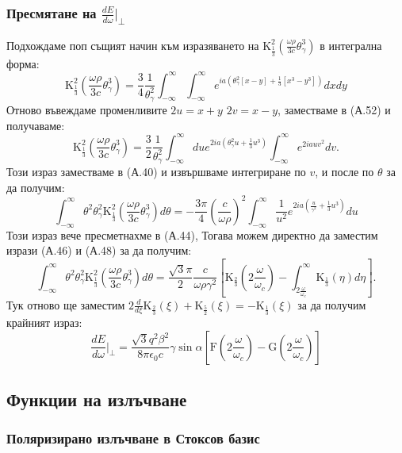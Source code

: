 \begin{appendices}
\subsubsection{Пресмятане на $\frac{dE}{d\omega}\big\vert_\perp$}
Подхождаме поп същият начин към изразяването на  $\text{K}^2_{\frac{1}{3}}\left(\frac{\omega\rho}{3 c}\theta_\gamma^3\right)$ в интегрална форма:
\begin{equation}
	\text{K}^2_{\frac{1}{3}}\left(\frac{\omega\rho}{3 c}\theta_\gamma^3\right) = 	\frac{3}{4}\frac{1}{\theta_\gamma^2}\int_{-\infty}^\infty \int_{-\infty}^\infty e^{ia\left(\theta_\gamma^2[x - y] + \frac{1}{3}[x^3 - y^3]\right)}dxdy
\end{equation}
Отново въвеждаме променливите $2u = x + y$ $2v = x - y$, заместваме в (А.52) и получаваме:
\begin{equation}
	\text{K}^2_{\frac{1}{3}}\left(\frac{\omega\rho}{3 c}\theta_\gamma^3\right) = 	\frac{3}{2}\frac{1}{\theta_\gamma^2}\int_{-\infty}^\infty du e^{2ia\left(\theta_\gamma^2 u + \frac{1}{3}u^3\right)}\int_{-\infty}^{\infty}e^{2iauv^2}dv.
\end{equation}
Този израз заместваме в (А.40) и извършваме интегриране по $v$, и после по $\theta$ за да получим:
\begin{equation}
	\int_{-\infty}^\infty \theta^2\theta_\gamma^2 \text{K}^2_{\frac{1}{3}}\left(\frac{\omega\rho}{3 c}\theta_\gamma^3\right)d\theta = -\frac{3\pi}{4}\left(\frac{c}{\omega\rho}\right)^2\int_{-\infty}^{\infty}\frac{1}{u^2} e^{2ia\left(\frac{u}{\gamma^2}+\frac{1}{3}u^3\right)}du
\end{equation}
Този израз вече пресметнахме в (А.44), Тогава можем директно да заместим изрази (А.46) и (А.48) за да получим:
\begin{equation}
	\int_{-\infty}^\infty \theta^2\theta_\gamma^2 \text{K}^2_{\frac{1}{3}}\left(\frac{\omega\rho}{3 c}\theta_\gamma^3\right)d\theta = \frac{\sqrt{3}\pi}{2}\frac{c}{\omega\rho \gamma^2}\left[\text{K}_{\frac{2}{3}}\left(2\frac{\omega}{\omega_c}\right) - \int_{2\frac{\omega}{\omega_c}}^\infty \text{K}_{\frac{1}{3}}(\eta)d\eta\right].
\end{equation}
Тук отново ще заместим $2\frac{d}{d\xi}\text{K}_{\frac{2}{3}}(\xi) + \text{K}_{\frac{5}{2}}(\xi) = - \text{K}_{\frac{1}{3}}(\xi)$ за да получим крайният израз:
\begin{equation}
	\boxed{\frac{dE}{d\omega}\bigg\vert_\perp = \frac{\sqrt{3}q^2\beta^2}{8\pi\epsilon_0 c}\gamma\sin\alpha\left[\text{F}\left(2\frac{\omega}{\omega_c}\right) - \text{G}\left(2\frac{\omega}{\omega_c}\right)\right]}
\end{equation}
\subsection{Функции на излъчване}

\subsubsection{Поляризирано излъчване в Стоксов базис}

\newpage

\end{appendices}
